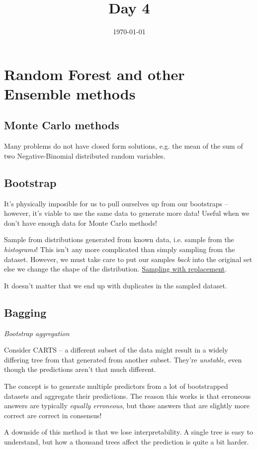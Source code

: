 \documentclass[11pt]{article}
\date{\today}
\title{Day 4}
\begin{document}
\maketitle
\tableofcontents

\section*{Random Forest and other Ensemble methods}
\label{sec-1}
\subsection*{Monte Carlo methods}
\label{sec-1-1}
Many problems do not have closed form solutions, e.g. the mean of the sum of two Negative-Binomial distributed random variables.
\subsection*{Bootstrap}
\label{sec-1-2}
It's physically imposible for us to pull ourselves up from our bootstraps -- however, it's viable to use the same data to generate more data! Useful when we don't have enough data for Monte Carlo methods!

Sample from distributions generated from known data, i.e. sample from the \emph{histograms}! This isn't any more complicated than simply sampling from the dataset. However, we must take care to put our samples \emph{back} into the original set else we change the shape of the distribution. \uline{Sampling with replacement}.

It doesn't matter that we end up with duplicates in the sampled dataset.
\subsection*{Bagging}
\label{sec-1-3}
\emph{Bootstrap aggregation}

Consider CARTS -- a different subset of the data might result in a widely differing tree from that generated from another subset. They're \emph{unstable}, even though the predictions aren't that much different.

The concept is to generate multiple predictors from a lot of bootstrapped datasets and aggregate their predictions. The reason this works is that erroneous answers are typically \emph{equally erroneous}, but those answers that are slightly more correct are correct in consensus!

A downside of this method is that we lose interpretability. A single tree is easy to understand, but how a thousand trees affect the prediction is quite a bit harder.
\end{document}
